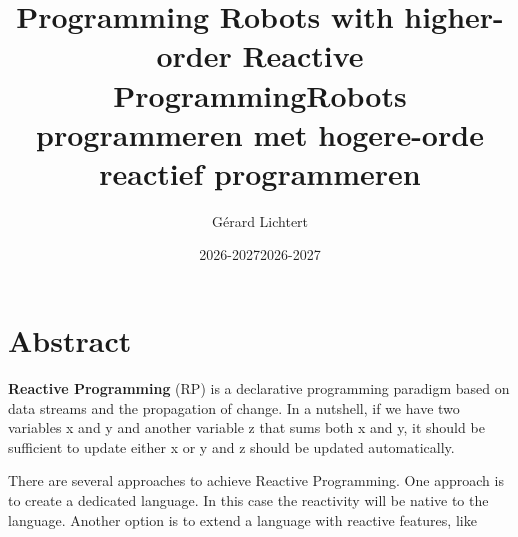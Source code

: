 \documentclass[a4paper]{book}
\title{Programming Robots with higher-order Reactive Programming}
\author{Gérard Lichtert}
\date{2026-2027}
\begin{document}
\frontmatter
\maketitle%

\title{Robots programmeren met hogere-orde reactief programmeren}
%
\date{2026-2027}%
%
\maketitle%

\raggedright
\chapter*{Abstract}

\textbf{Reactive Programming} (RP) is a declarative programming paradigm based on
data streams and the propagation of change. In a nutshell, if we have two
variables x and y and another variable z that sums both x and y, it should be sufficient to
update either x or y and z should be updated automatically.
\par
There are several approaches to achieve Reactive Programming. One approach is to
create a dedicated language. In this case the reactivity will be native to the
language. Another option is to extend a language with reactive features, like

\tableofcontents

\mainmatter

\end{document}
